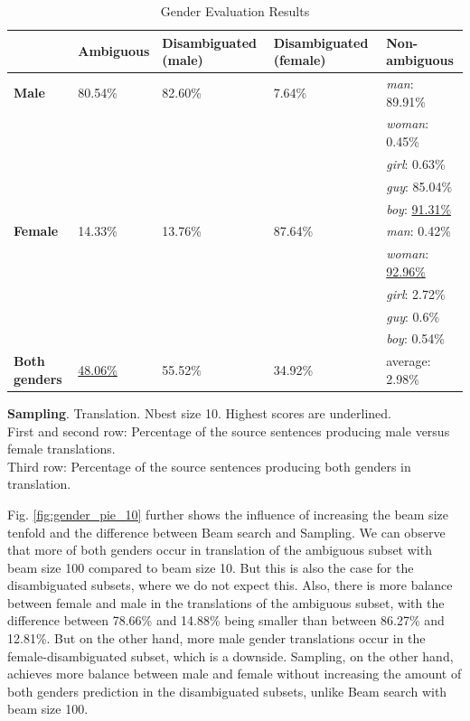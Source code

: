 \begin{table}[!htb]
    \ContinuedFloat 
    \begin{subtable}{\textwidth}
        \centering
        \begin{tabularx}{\linewidth}{|X|XXXX|}
            \hline
             & \textbf{Ambiguous} & \textbf{Disambiguated (male)} & \textbf{Disambiguated (female)} & \textbf{Non-ambiguous} \\ \hline
             \textbf{Male} & 80.54\% & 82.60\% & 7.64\% & \textit{man}: 89.91\% \\
             &&&& \textit{woman}: 0.45\% \\
             &&&& \textit{girl}: 0.63\% \\
             &&&& \textit{guy}: 85.04\% \\
             &&&& \textit{boy}: \underline{91.31\%} \\ \hline
             \textbf{Female} & 14.33\% & 13.76\% & 87.64\% & \textit{man}: 0.42\% \\ 
             &&&& \textit{woman}: \underline{92.96\%} \\
             &&&& \textit{girl}: 2.72\% \\
             &&&& \textit{guy}: 0.6\% \\
             &&&& \textit{boy}: 0.54\% \\\hline
             \textbf{Both genders} & \underline{48.06\%} & 55.52\% & 34.92\% & average: 2.98\% \\ \hline
        \end{tabularx}

        \caption{\textbf{Sampling}. Translation. Nbest size 10. Highest scores are underlined. \\ First and second row: Percentage of the source sentences producing male versus female translations. \\ Third row: Percentage of the source sentences producing both genders in translation.}
        \label{tab:gender_percent_sampling}
    \end{subtable}
    
    \caption{Gender Evaluation Results}
    \label{tab:gender_percent}
\end{table}


Fig. \ref{fig:gender_pie_10} further shows the influence of increasing the beam size tenfold and the difference between Beam search and Sampling. We can observe that more of both genders occur in translation of the ambiguous subset with beam size 100 compared to beam size 10. But this is also the case for the disambiguated subsets, where we do not expect this. Also, there is more balance between female and male in the translations of the ambiguous subset, with the difference between 78.66\% and 14.88\% being smaller than between 86.27\% and 12.81\%. But on the other hand, more male gender translations occur in the female-disambiguated subset, which is a downside. Sampling, on the other hand, achieves more balance between male and female without increasing the amount of both genders prediction in the disambiguated subsets, unlike Beam search with beam size 100.

